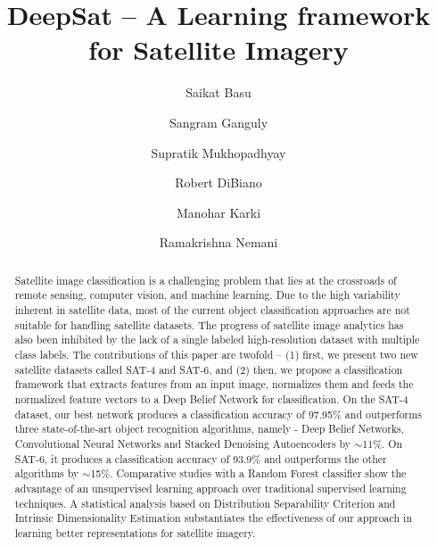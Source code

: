 \documentclass[11pt,a4paper]{article}
\begin{document}
\title{DeepSat -- A Learning framework for Satellite Imagery}





\author[1]{Saikat Basu}
\author[2]{Sangram Ganguly}
\author[1]{Supratik Mukhopadhyay}
\author[1]{Robert DiBiano}
\author[1]{Manohar Karki}
\author[3]{Ramakrishna Nemani}

\renewcommand\Authands{ and }





\maketitle
\begin{abstract}
Satellite image classification is a challenging problem that lies at the crossroads of remote sensing, computer vision, and machine learning. Due to the high variability inherent in satellite data, most of the current object classification approaches are not suitable for handling satellite datasets. The progress of satellite image analytics has also been inhibited by the lack of a single labeled high-resolution dataset with multiple class labels. The contributions of this paper are twofold -- (1) first, we present two new satellite datasets called SAT-4 and SAT-6, and (2) then, we propose a classification framework that extracts features from an input image, normalizes them and feeds the normalized feature vectors to a Deep Belief Network for classification. On the SAT-4 dataset, our best network produces a classification accuracy of 97.95\% and outperforms three state-of-the-art object recognition algorithms, namely - Deep Belief Networks, Convolutional Neural Networks and Stacked Denoising Autoencoders by $\sim$11\%. On SAT-6, it produces a classification accuracy of 93.9\% and outperforms the other algorithms by $\sim$15\%. Comparative studies with a Random Forest classifier show the advantage of an unsupervised learning approach over traditional supervised learning techniques. A statistical analysis based on Distribution Separability Criterion and Intrinsic Dimensionality Estimation substantiates the effectiveness of our approach in learning better representations for satellite imagery. 
\end{abstract}
\end{document}
